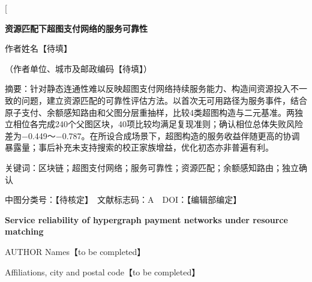 \documentclass[UTF8,a4paper,twocolumn,fontset=none,zihao=5]{ctexart}
\begin{document}
\twocolumn[{\begin{minipage}{\textwidth}

\begin{center}\bfseries 资源匹配下超图支付网络的服务可靠性\end{center}

\begin{center}\small 作者姓名【待填】\end{center}

\begin{center}\small （作者单位、城市及邮政编码【待填】）\end{center}

{\small\noindent 摘要：针对静态连通性难以反映超图支付网络持续服务能力、构造间资源投入不一致的问题，建立资源匹配的可靠性评估方法。以首次无可用路径为服务事件，结合原子支付、余额感知路由和父图分层重抽样，比较4类超图构造与二元基准。两独立相位各完成240个父图区块，40项比较均满足复现准则；确认相位总体失败风险差为$-$0.449～$-$0.787。在所设合成场景下，超图构造的服务收益伴随更高的协调暴露量；事后补充未支持搜索的校正家族增益，优化初态亦非普遍有利。\par}\vspace{3pt}

{\small\noindent 关键词：区块链；超图支付网络；服务可靠性；资源匹配；余额感知路由；独立确认\par}\vspace{3pt}

{\small\noindent 中图分类号：【待核定】　文献标志码：A　DOI：【编辑部编定】\par}\vspace{3pt}

\begin{center}\large\bfseries Service reliability of hypergraph payment networks under resource matching\end{center}

\begin{center}\small AUTHOR Names【to be completed】\end{center}

\begin{center}\small Affiliations, city and postal code【to be completed】\end{center}


\end{minipage}}
\end{document}
